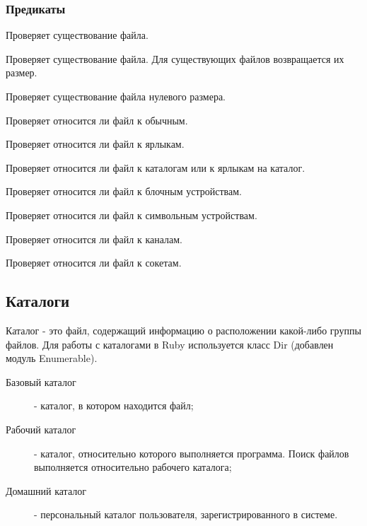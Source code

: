 \subsubsection*{Предикаты}

\begin{methodlist}
  Проверяет существование файла. 

  Проверяет существование файла. Для существующих файлов возвращается их размер.

  Проверяет существование файла нулевого размера. 

  Проверяет относится ли файл к обычным. 

  Проверяет относится ли файл к ярлыкам. 

  Проверяет относится ли файл к каталогам или к ярлыкам на каталог. 

  Проверяет относится ли файл к блочным устройствам. 

  Проверяет относится ли файл к символьным устройствам. 

  Проверяет относится ли файл к каналам. 

  Проверяет относится ли файл к сокетам.
\end{methodlist} 

\subsection{Каталоги}

Каталог - это файл, содержащий информацию о расположении какой-либо группы файлов. Для работы с каталогами в Ruby используется класс Dir (добавлен модуль Enumerable).

\begin{description}
  \item[Базовый каталог]- каталог, в котором находится файл;
  \item[Рабочий каталог] - каталог, относительно которого выполняется программа. Поиск файлов выполняется относительно рабочего каталога;
  \item[Домашний каталог] - персональный каталог пользователя, зарегистрированного в системе.
\end{description}

